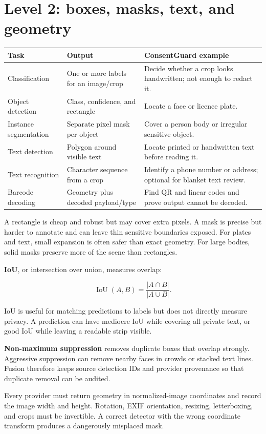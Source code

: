 \section{Level 2: boxes, masks, text, and geometry}

\begin{tabularx}{\textwidth}{@{}L{34mm}YY@{}}
\toprule
\textbf{Task} & \textbf{Output} & \textbf{ConsentGuard example} \\
\midrule
Classification & One or more labels for an image/crop & Decide whether a crop looks handwritten; not enough to redact it. \\
Object detection & Class, confidence, and rectangle & Locate a face or licence plate. \\
Instance segmentation & Separate pixel mask per object & Cover a person body or irregular sensitive object. \\
Text detection & Polygon around visible text & Locate printed or handwritten text before reading it. \\
Text recognition & Character sequence from a crop & Identify a phone number or address; optional for blanket text review. \\
Barcode decoding & Geometry plus decoded payload/type & Find QR and linear codes and prove output cannot be decoded. \\
\bottomrule
\end{tabularx}

A rectangle is cheap and robust but may cover extra pixels. A mask is precise but harder to annotate and can leave thin sensitive boundaries exposed. For plates and text, small expansion is often safer than exact geometry. For large bodies, solid masks preserve more of the scene than rectangles.

\textbf{IoU}, or intersection over union, measures overlap:

\[
  \operatorname{IoU}(A,B) = \frac{|A \cap B|}{|A \cup B|}.
\]

IoU is useful for matching predictions to labels but does not directly measure privacy. A prediction can have mediocre IoU while covering all private text, or good IoU while leaving a readable strip visible.

\textbf{Non-maximum suppression} removes duplicate boxes that overlap strongly. Aggressive suppression can remove nearby faces in crowds or stacked text lines. Fusion therefore keeps source detection IDs and provider provenance so that duplicate removal can be audited.

\begin{conceptbox}
Every provider must return geometry in normalized-image coordinates and record the image width and height. Rotation, EXIF orientation, resizing, letterboxing, and crops must be invertible. A correct detector with the wrong coordinate transform produces a dangerously misplaced mask.
\end{conceptbox}

